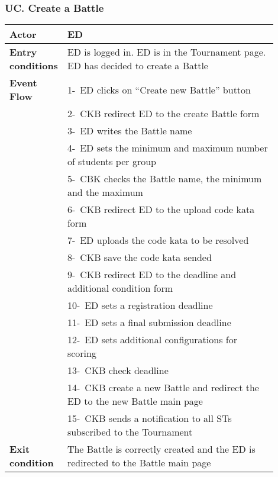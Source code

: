 \subsubsection*{UC\cuc . Create a Battle}
\begin{center}
    \begin{longtable}{|l|p{0.9\linewidth}|}
        \hline
        \textbf{Actor}            & ED                                                                                                                                                                                       \\
        \hline
        \textbf{Entry conditions} & ED is logged in. ED is in the Tournament page. ED has decided to create a Battle        \\
        \hline
        \textbf{Event Flow}       & 1-\ ED clicks on “Create new Battle” button        \\
        & 2-\ CKB redirect ED to the create Battle form        \\
        & 3-\ ED writes the Battle name        \\
        & 4-\ ED sets the minimum and maximum number of students per group        \\
        & 5-\ CBK checks the Battle name, the minimum and the maximum        \\
        & 6-\ CKB redirect ED to the upload code kata form        \\
        & 7-\ ED uploads the code kata to be resolved        \\
        & 8-\ CKB save the code kata sended        \\
        & 9-\ CKB redirect ED to the deadline and additional condition form        \\
        & 10-\ ED sets a registration deadline        \\
        & 11-\ ED sets a final submission deadline        \\
        & 12-\ ED sets additional configurations for scoring        \\
        & 13-\ CKB check deadline         \\
        & 14-\ CKB create a new Battle and redirect the ED to the new Battle main page        \\
        & 15-\ CKB sends a notification to all STs subscribed to the Tournament         \\
        \hline
        \textbf{Exit condition}   & The Battle is correctly created and the ED is redirected to the Battle main page        \\

\end{longtable}
\end{center}
